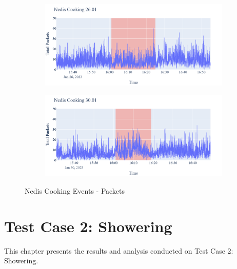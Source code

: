 \begin{figure}[H]
\begin{subfigure}[b]{0.5\textwidth}
        \centering
        \includegraphics[width=1.2\hsize]{figures/Nedis_Cooking_Packets_26.01.png}
    \end{subfigure}
    \begin{subfigure}[b]{0.5\textwidth}
        \centering
        \includegraphics[width=1.2\hsize]{figures/Nedis_Cooking_Packets_30.01.png}
    \end{subfigure}
    \caption{Nedis Cooking Events - Packets}
    \label{fig:NedisCookingPackets}
\end{figure}
\section{Test Case 2: Showering}
This chapter presents the results and analysis conducted on Test Case 2: Showering. 
